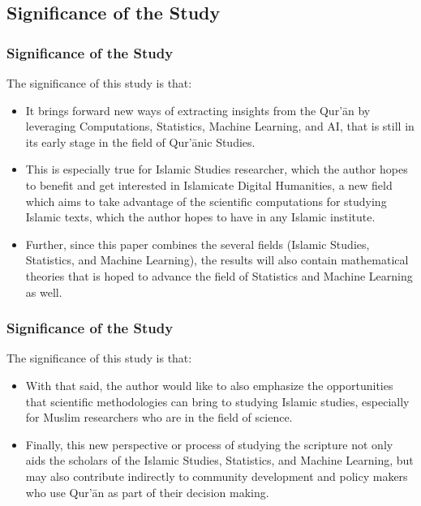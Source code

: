 \documentclass{beamer}
\theoremstyle{definition}
\begin{document}
\subsection{Significance of the Study}
\begin{frame}[t, fragile]\justifying
\frametitle{Significance of the Study}
The significance of this study is that:
\begin{itemize}
    \item It brings forward new ways of extracting insights from the Qur'\=an by leveraging Computations, Statistics, Machine Learning, and AI, that is still in its early stage in the field of Qur'\=anic Studies. \pause
    \item This is especially true for Islamic Studies researcher, which the author hopes to benefit and get interested in Islamicate Digital Humanities, a new field which aims to take advantage of the scientific computations for studying Islamic texts, which the author hopes to have in any Islamic institute. \pause
    \item Further, since this paper combines the several fields (Islamic Studies, Statistics, and Machine Learning), the results will also contain mathematical theories that is hoped to advance the field of Statistics and Machine Learning as well.
\end{itemize}
\end{frame}

\begin{frame}[t, fragile]\justifying
\frametitle{Significance of the Study}
The significance of this study is that:
\begin{itemize}
\item With that said, the author would like to also emphasize the opportunities that scientific methodologies can bring to studying Islamic studies, especially for Muslim researchers who are in the field of science. \pause
\item Finally, this new perspective or process of studying the scripture not only aids the scholars of the Islamic Studies, Statistics, and Machine Learning, but may also contribute indirectly to community development and policy makers who use Qur'\=an as part of their decision making.
\end{itemize}
\end{frame}
\end{document}
